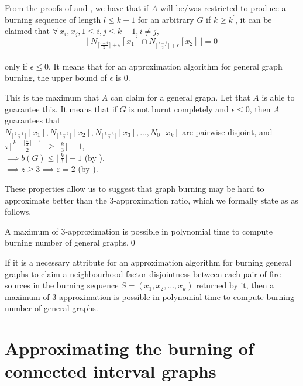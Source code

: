 From the proofs of  and , we have that if $A$ will be/was restricted to produce a burning sequence of length $l \leq k-1$ for an arbitrary $G$ if $k \geq k^{\prime}$, it can be claimed that $\forall\ x_i, x_j, 1 \leq i, j \leq k-1, i \neq j,$
$$\Big |\ N_{\big\lceil\frac{l-i}{2} \big\rceil + \epsilon}[x_1] \cap N_{\big\lceil\frac{l-j}{2} \big\rceil + \epsilon}[x_2]\ \Big | = 0$$\\
only if $\epsilon \leq 0$. It means that for an approximation algorithm for general graph burning, the upper bound of $\epsilon$ is 0.

This is the maximum that $A$ can claim for a general graph. Let that $A$ is able to guarantee this. It means that if $G$ is not burnt completely and $\epsilon \leq 0$, then $A$ guarantees that\\
$N_{\lceil\frac{k-1}{2}\rceil}[x_1], N_{\lceil\frac{k-2}{2}\rceil}[x_2], N_{\lceil\frac{k-3}{2}\rceil}[x_3], . . ., N_0[x_k]$ are pairwise disjoint, and\\
$\because \Bigg\lceil \frac{k-\big\lceil\frac{k}{3}\big\rceil-1}{2} \Bigg\rceil \geq \big\lfloor \frac{k}{3} \big\rfloor-1$,\\
$\implies b(G) \leq \big\lfloor\frac{k}{3}\big\rfloor+1$ (by ).\\
$\implies z \geq 3 \implies \varepsilon = 2$ (by ).

These properties allow us to suggest that graph burning may be hard to approximate better than the $3$-approximation ratio, which we formally state as  as follows.

\begin{conjecture}\label{conjecture:no-better-than-3-approx}
    A maximum of 3-approximation is possible in polynomial time to compute burning number of general graphs.\qed
\end{conjecture}

If it is a necessary attribute for an approximation algorithm for burning general graphs to claim a neighbourhood factor disjointness between each pair of fire sources in the burning sequence $S = (x_1, x_2, . . ., x_k)$ returned by it, then a maximum of 3-approximation is possible in polynomial time to compute burning number of general graphs.

\section{Approximating the burning of connected interval graphs}

